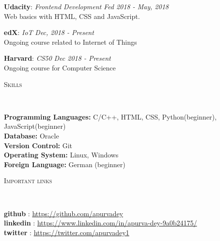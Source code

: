 \documentclass[9pt]{article}
\newenvironment{changemargin}[2]{%
  \begin{list}{}{%
    \setlength{\topsep}{0pt}%
    \setlength{\leftmargin}{#1}%
    \setlength{\rightmargin}{#2}%
    \setlength{\listparindent}{\parindent}%
    \setlength{\itemindent}{\parindent}%
    \setlength{\parsep}{\parskip}%
  }%
  \item[]}{\end{list}
}
\newcommand{\lineover}{
    \begin{changemargin}{-0.05in}{-0.05in}
        \vspace*{-8pt}
        \hrulefill \\
        \vspace*{-2pt}
    \end{changemargin}
}
\newcommand{\header}[1]{
    \begin{changemargin}{-0.5in}{-0.5in}
        \scshape{#1}\\
    \lineover
    \end{changemargin}
}
\newenvironment{body} {
    \vspace*{-16pt}
    \begin{changemargin}{-0.25in}{-0.5in}
  }
    {\end{changemargin}
}
\begin{document}
\begin{body}
    \vspace{14pt}
    \textbf{Udacity}: \emph{Frontend Development} \hfill \emph{Fed 2018 - May, 2018}\\
    Web basics with HTML, CSS and JavaScript.
    \vspace*{-4pt}
    \vspace{14pt}

    \textbf{edX}: \emph{IoT} \hfill \emph{Dec, 2018 - Present}\\
    Ongoing course related to Internet of Things
    \vspace*{-4pt}

    \vspace{14pt}
    
    \textbf{Harvard}: \emph{CS50} \hfill \emph{Dec 2018 - Present}\\
    Ongoing course for Computer Science
    \vspace*{-4pt}
    \vspace{14pt}
\end{body}

\smallskip


\header{Skills}

\begin{body}
    \vspace{14pt}
    \textbf{Programming Languages:}{} C/C++, HTML, CSS, Python(beginner), JavaScript(beginner)\\
    \textbf{Database:}{} Oracle\\
    \textbf{Version Control:}{} Git\\
    \textbf{Operating System:}{} Linux, Windows\\
    \textbf{Foreign Language:}{} German (beginner)\\
\end{body}

\smallskip


\header{Important links}

\begin{body}
    \vspace{14pt}
    \textbf{github} :  \url{https://github.com/apurvadey}\\
    \smallskip
    \textbf{linkedin} :  \url{https://www.linkedin.com/in/apurva-dey-9a0b24175/}\\
    \smallskip
    \textbf{twitter} :  \url{https://twitter.com/apurvadey1}\\
\end{body}
\end{document}
